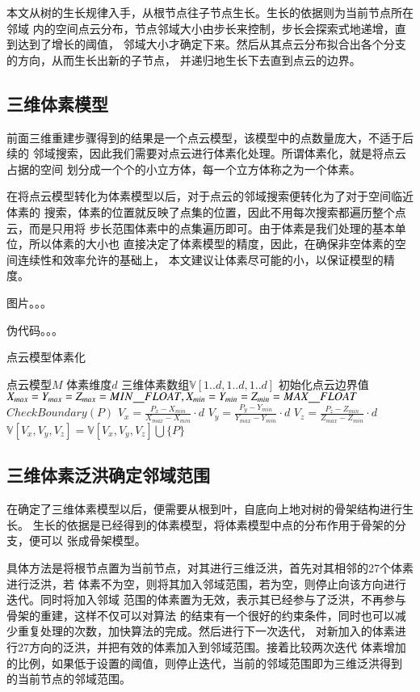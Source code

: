 本文从树的生长规律入手，从根节点往子节点生长。生长的依据则为当前节点所在邻域
内的空间点云分布，节点邻域大小由步长来控制，步长会探索式地递增，直到达到了增长的阈值，
邻域大小才确定下来。然后从其点云分布拟合出各个分支的方向，从而生长出新的子节点，
并递归地生长下去直到点云的边界。

\subsection{三维体素模型}
前面三维重建步骤得到的结果是一个点云模型，该模型中的点数量庞大，不适于后续的
邻域搜索，因此我们需要对点云进行体素化处理。所谓体素化，就是将点云占据的空间
划分成一个个的小立方体，每一个立方体称之为一个体素。

在将点云模型转化为体素模型以后，对于点云的邻域搜索便转化为了对于空间临近体素的
搜索，体素的位置就反映了点集的位置，因此不用每次搜索都遍历整个点云，而是只用将
步长范围体素中的点集遍历即可。由于体素是我们处理的基本单位，所以体素的大小也
直接决定了体素模型的精度，因此，在确保非空体素的空间连续性和效率允许的基础上，
本文建议让体素尽可能的小，以保证模型的精度。

图片。。。

伪代码。。。
\begin{algorithm}
	\caption{点云模型体素化}
\begin{algorithmic}[1]
	\Require 点云模型$M$
	\Require 体素维度$d$
	\Ensure 三维体素数组$\mathbb{V}[1..d,1..d,1..d]$
	\State 初始化点云边界值$X_{max}=Y_{max}=Z_{max}=MIN\uline\quad FLOAT,X_{min}=Y_{min}=Z_{min}=MAX\uline\quad FLOAT$
		\State $CheckBoundary(P)$
	\EndFor
{}
\State $V_x = \frac{P_x-X_{min}}{X_{max}-X_{min}}\cdot d$
\State $V_y = \frac{P_y-Y_{min}}{Y_{max}-Y_{min}}\cdot d$
\State $V_z = \frac{P_z-Z_{min}}{Z_{max}-Z_{min}}\cdot d$
\State $\mathbb{V}[V_x, V_y, V_z] = \mathbb{V}[V_x, V_y, V_z] \bigcup \{P\} $
	\EndFor
\end{algorithmic}
\end{algorithm}

\subsection{三维体素泛洪确定邻域范围}
在确定了三维体素模型以后，便需要从根到叶，自底向上地对树的骨架结构进行生长。
生长的依据是已经得到的体素模型，将体素模型中点的分布作用于骨架的分支，便可以
张成骨架模型。

具体方法是将根节点置为当前节点，对其进行三维泛洪，首先对其相邻的27个体素进行泛洪，若
体素不为空，则将其加入邻域范围，若为空，则停止向该方向进行迭代。同时将加入邻域
范围的体素置为无效，表示其已经参与了泛洪，不再参与骨架的重建，这样不仅可以对算法
的结束有一个很好的约束条件，同时也可以减少重复处理的次数，加快算法的完成。然后进行下一次迭代，
对新加入的体素进行27方向的泛洪，并把有效的体素加入到邻域范围。接着比较两次迭代
体素增加的比例，如果低于设置的阈值，则停止迭代，当前的邻域范围即为三维泛洪得到
的当前节点的邻域范围。

